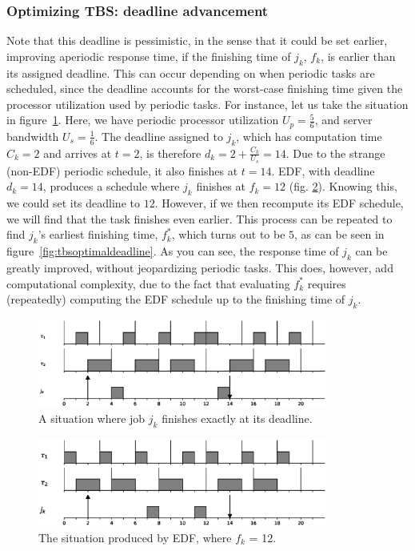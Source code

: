 \documentclass[twoside]{uva-inf-bachelor-thesis}
\begin{document}
\subsubsection{Optimizing TBS: deadline advancement}
Note that this deadline is pessimistic, in the sense that it could be set earlier, improving aperiodic response time, if the finishing time of $j_k$, $f_k$, is earlier than its assigned deadline. This can occur depending on when periodic tasks are scheduled, since the deadline accounts for the worst-case finishing time given the processor utilization used by periodic tasks. For instance, let us take the situation in figure~\ref{fig:tbsworstdeadline}. Here, we have periodic processor utilization $U_p = \frac{5}{6}$, and server bandwidth $U_s = \frac{1}{6}$. The deadline assigned to $j_k$, which has computation time $C_k = 2$ and arrives at $t = 2$, is therefore $d_k = 2 + \frac{C_k}{U_s} = 14$. Due to the strange (non-EDF) periodic schedule, it also finishes at $t = 14$. EDF, with deadline $d_k = 14$, produces a schedule where $j_k$ finishes at $f_k = 12$ (fig. \ref{fig:tbsedfdeadline}). Knowing this, we could set its deadline to $12$. However, if we then recompute its EDF schedule, we will find that the task finishes even earlier. This process can be repeated to find $j_k$'s earliest finishing time, $f^*_k$, which turns out to be $5$, as can be seen in figure~\ref{fig:tbsoptimaldeadline}. As you can see, the response time of $j_k$ can be greatly improved, without jeopardizing periodic tasks. This does, however, add computational complexity, due to the fact that evaluating $f^*_k$ requires (repeatedly) computing the EDF schedule up to the finishing time of $j_k$.

\begin{figure}[htpb]
    \centering
    \includegraphics[width=0.85\textwidth]{worstcasedeadline.eps}
    \caption{A situation where job $j_k$ finishes exactly at its deadline.}
    \label{fig:tbsworstdeadline}
\end{figure}

\begin{figure}[htpb]
    \centering
    \includegraphics[width=0.85\textwidth]{edfdeadline.eps}
    \caption{The situation produced by EDF, where $f_k$ = 12.}
    \label{fig:tbsedfdeadline}
\end{figure}
\end{document}
